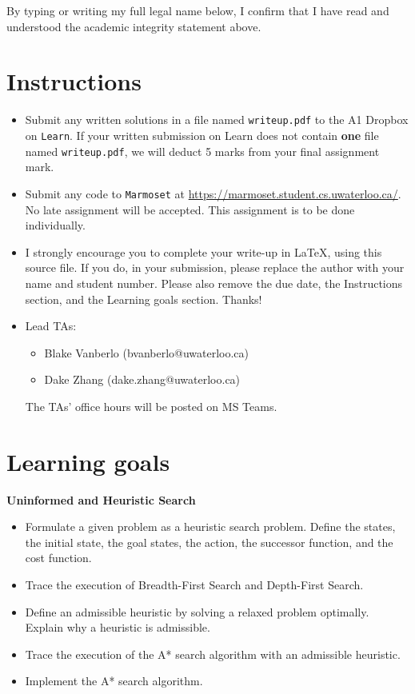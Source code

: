 \documentclass[12pt]{article}
\begin{document}
By typing or writing my full legal name below, I confirm that I have read and understood the academic integrity statement above.


\newpage
\section*{Instructions}

\begin{itemize}
\item
Submit any written solutions in a file named \verb+writeup.pdf+ to the A1 Dropbox on \verb+Learn+. {\color{red} If your written submission on Learn does not contain \textbf{one} file named \verb+writeup.pdf+, we will deduct 5 marks from your final assignment mark.} 
\item Submit any code to \verb+Marmoset+ at \url{https://marmoset.student.cs.uwaterloo.ca/}. 
No late assignment will be accepted. This assignment is to be done individually.

\item 
I strongly encourage you to complete your write-up in LaTeX, using this source file. If you do, in your submission, please replace the author with your name and student number. Please also remove the due date, the Instructions section, and the Learning goals section. Thanks!

\item
Lead TAs: 
\begin{itemize}
\item 
Blake Vanberlo (bvanberlo@uwaterloo.ca)
\item
Dake Zhang (dake.zhang@uwaterloo.ca)
\end{itemize}
The TAs' office hours will be posted on MS Teams.
\end{itemize}



\section*{Learning goals}

{\bf Uninformed and Heuristic Search}
\begin{itemize}
\item Formulate a given problem as a heuristic search problem. Define the states, the initial state, the goal states, the action, the successor function, and the cost function.
\item Trace the execution of Breadth-First Search and Depth-First Search.
\item Define an admissible heuristic by solving a relaxed problem optimally. Explain why a heuristic is admissible.
\item Trace the execution of the A* search algorithm with an admissible heuristic.
\item Implement the A* search algorithm.
\end{itemize}
\end{document}
